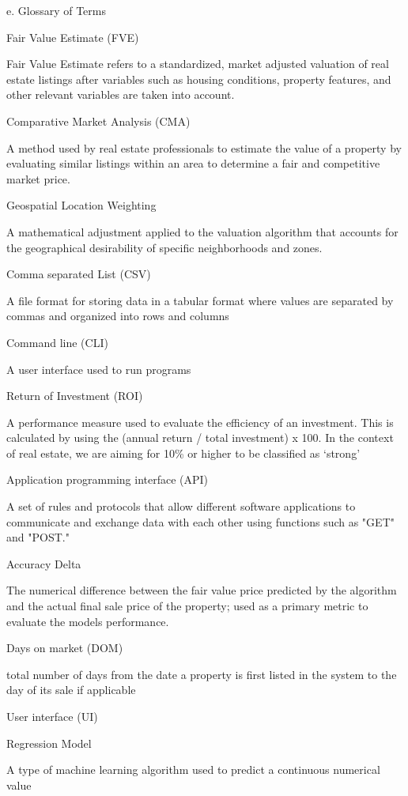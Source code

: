 e. Glossary of Terms

Fair Value Estimate (FVE)

Fair Value Estimate refers to a standardized, market adjusted valuation
of real estate listings after variables such as housing conditions,
property features, and other relevant variables are taken into account.

Comparative Market Analysis (CMA)

A method used by real estate professionals to estimate the value of a
property by evaluating similar listings within an area to determine a
fair and competitive market price.

Geospatial Location Weighting

A mathematical adjustment applied to the valuation algorithm that
accounts for the geographical desirability of specific neighborhoods and
zones.

Comma separated List (CSV)

A file format for storing data in a tabular format where values are
separated by commas and organized into rows and columns

Command line (CLI)

A user interface used to run programs

Return of Investment (ROI)

A performance measure used to evaluate the efficiency of an investment.
This is calculated by using the (annual return / total investment) x
100. In the context of real estate, we are aiming for 10\% or higher to
be classified as `strong'

Application programming interface (API)

A set of rules and protocols that allow different software applications
to communicate and exchange data with each other using functions such as
"GET" and "POST."

Accuracy Delta

The numerical difference between the fair value price predicted by the
algorithm and the actual final sale price of the property; used as a
primary metric to evaluate the model\textquotesingle s performance.

Days on market (DOM)

total number of days from the date a property is first listed in the
system to the day of its sale if applicable

User interface (UI)

Regression Model

A type of machine learning algorithm used to predict a continuous
numerical value

